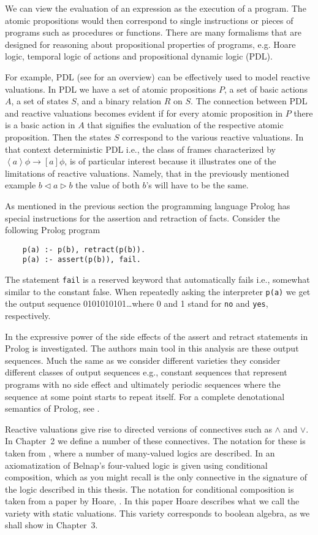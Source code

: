 \documentclass[a4paper,twoside,openright]{report}
\newcommand{\lef}{\ensuremath{\triangleleft}}
\newcommand{\rig}{\ensuremath{\triangleright}}
\begin{document}
We can view the evaluation of an expression as the execution of a program. The atomic propositions would then correspond to single instructions or pieces of programs such as procedures or functions. There are many formalisms that are designed for reasoning about propositional properties of programs, e.g. Hoare logic, temporal logic of actions and propositional dynamic logic (PDL). 

For example, PDL (see \cite{PDL} for an overview) can be effectively used to model reactive valuations. In PDL we have a set of atomic propositions $P$, a set of basic actions $A$, a set of states $S$, and a binary relation $R$ on $S$. The connection between PDL and reactive valuations becomes evident if for every atomic proposition in $P$ there is a basic action in $A$ that signifies the evaluation of the respective atomic proposition. Then the states $S$ correspond to the various reactive valuations. In that context deterministic PDL i.e., the class of frames characterized by $\left<a\right>\phi\to\left[a\right]\phi$, is of particular interest because it illustrates one of the limitations of reactive valuations. Namely, that in the previously mentioned example $b\lef a\rig b$ the value of both $b$'s will have to be the same.

As mentioned in the previous section the programming language Prolog has special instructions for the assertion and retraction of facts.  Consider the following Prolog program
\begin{verbatim}
    p(a) :- p(b), retract(p(b)).
    p(a) :- assert(p(b)), fail.
\end{verbatim}
The statement \verb|fail| is a reserved keyword that automatically fails i.e., somewhat similar to the constant false. When repeatedly asking the interpreter \verb|p(a)| we get the output sequence 0101010101\ldots where 0 and 1 stand for \verb|no| and \verb|yes|, respectively.

In \cite{prolog_expr} the expressive power of the side effects of the assert and retract statements in Prolog is investigated. The authors main tool in this analysis are these output sequences. Much the same as we consider different varieties they consider different classes of output sequences e.g., constant sequences that represent programs with no side effect and ultimately periodic sequences where the sequence at some point starts to repeat itself. For a complete denotational semantics of Prolog, see \cite{prolog_semantics}.

Reactive valuations give rise to directed versions of connectives such as $\wedge$ and $\vee$. In Chapter~2 we define a number of these connectives. The notation for these is taken from \cite{connectives}, where a number of many-valued logics are described. In \cite{belnap_cond} an axiomatization of Belnap's four-valued logic is given using conditional composition, which as you might recall is the only connective in the signature of the logic described in this thesis. The notation for conditional composition is taken from a paper by Hoare, \cite{hoare}. In this paper Hoare describes what we call the variety with static valuations. This variety corresponds to boolean algebra, as we shall show in Chapter~3.
\end{document}
